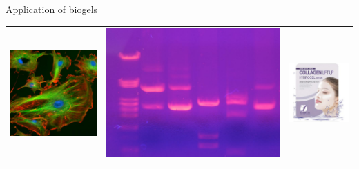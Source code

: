 \documentclass[xcolor=table]{beamer}
\begin{document}
\begin{frame}{Application of biogels}
\begin{tabu}{cX[c]c}
\includegraphics[height=0.3\textheight]{cell_mech} &
\includegraphics[height=0.3\textheight]{electrophoresis} &
\includegraphics[height=0.3\textheight]{cosmetics} \\

\end{tabu}
\end{frame}
\end{document}
